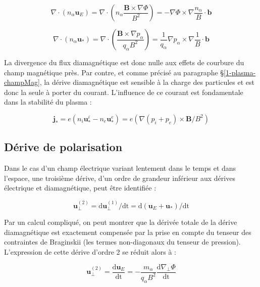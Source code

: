 \begin{refsection}
\begin{equation}
\nabla\cdot\left(n_\alpha\mathbf
u_E\right)=\nabla\cdot\left(n_\alpha\frac{\mathbf B\times\nabla
\Phi}{B^2}\right) =-\nabla \Phi\times\nabla\frac{n_\alpha}{B}\cdot \mathbf b
\end{equation}

\begin{equation}
\nabla\cdot\left(n_\alpha\mathbf
u_*\right)=\nabla\cdot\left(\frac{\mathbf B\times\nabla
p_\alpha}{q_\alpha B^2}\right)
=\frac{1}{q_\alpha}\nabla p_\alpha\times\nabla\frac{1}{B}\cdot \mathbf b
\end{equation}

La divergence du flux diamagnétique est donc nulle aux effets de courbure du
champ magnétique près. Par contre, et comme
précisé au paragraphe \S\ref{1-plasma-champMag}, la dérive diamagnétique est 
sensible à la charge des particules et est donc la seule à porter du courant.
L'influence de ce courant est fondamentale dans la stabilité du plasma :

\begin{equation}
\mathbf j_*=e(n_i\mathbf u^i_*-n_e\mathbf
u^e_*)=e(\nabla(p_i+p_e)\times\mathbf B/B^2)
\end{equation}



\subsection{Dérive de polarisation}

Dans le cas d'un champ électrique variant lentement dans le temps et dans
l'espace, une troisième dérive, d'un ordre de grandeur inférieur aux dérives
électrique et diamagnétique, peut être identifiée : 

\begin{equation}
\label{1-vitessePol}
\mathbf{u}_\perp^{(2)}= \text{d}\mathbf
u_\perp^{(1)}/\text{dt}=\text{d}(\mathbf
u_E+\mathbf
u_*)/\text{dt}
\end{equation}

Par un calcul compliqué, on peut montrer que la dérivée totale de la dérive
diamagnétique est exactement compensée par la prise en compte du tenseur des
contraintes de Braginskii (les termes non-diagonaux du tenseur de
pression). L'expression de cette dérive d'ordre 2 se réduit alors à :

\begin{equation}
\label{1-vitessePol}
\mathbf{u}_\perp^{(2)}= \frac{\text{d}\mathbf
u_E}{\text{dt}}=-\frac{m_\alpha}{q_\alpha B^2}\frac{\text{d}\nabla_\perp
\Phi}{\text{dt}}
\end{equation}


\end{refsection}
